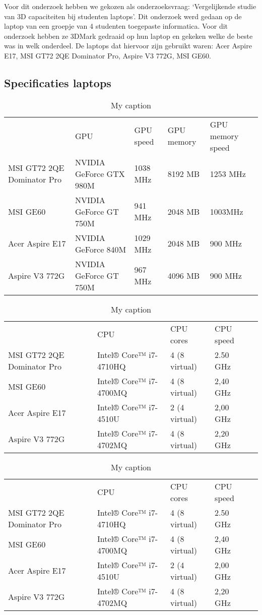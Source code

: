 Voor dit onderzoek hebben we gekozen als onderzoeksvraag: ‘Vergelijkende studie van 3D capaciteiten bij studenten laptops’. Dit onderzoek werd gedaan op de laptop van een groepje van 4 studenten toegepaste informatica. Voor dit onderzoek hebben ze 3DMark gedraaid op hun laptop en gekeken welke de beste was in welk onderdeel. De laptops dat hiervoor zijn gebruikt waren: Acer Aspire E17, MSI GT72 2QE Dominator Pro, Aspire V3 772G, MSI GE60. 
\subsection{Specificaties laptops}
\begin{table}[]
\centering
\caption{My caption}
\label{my-label}
\begin{tabular}{lllll}
                           & GPU                     & GPU speed & GPU memory & GPU memory speed \\
MSI GT72 2QE Dominator Pro & NVIDIA GeForce GTX 980M & 1038 MHz  & 8192 MB    & 1253 MHz         \\
MSI GE60                   & NVIDIA GeForce GT 750M  & 941 MHz   & 2048 MB    & 1003MHz          \\
Acer Aspire E17            & NVIDIA GeForce 840M     & 1029 MHz  & 2048 MB    & 900 MHz          \\
Aspire V3 772G             & NVIDIA GeForce GT 750M  & 967 MHz   & 4096 MB    & 900 MHz         
\end{tabular}
\end{table}
\begin{table}[]
\centering
\caption{My caption}
\label{my-label}
\begin{tabular}{lllll}
                           & CPU                    & CPU cores     & CPU speed   \\
MSI GT72 2QE Dominator Pro & Intel® Core™ i7-4710HQ & 4 (8 virtual) & 2.50 GHz    \\
MSI GE60                   & Intel® Core™ i7-4700MQ & 4 (8 virtual) & 2,40 GHz    \\
Acer Aspire E17            & Intel® Core™ i7-4510U  & 2 (4 virtual) & 2,00 GHz    \\
Aspire V3 772G             & Intel® Core™ i7-4702MQ & 4 (8 virtual) & 2,20 GHz  
\end{tabular}
\end{table}
\begin{table}[]
\centering
\caption{My caption}
\label{my-label}
\begin{tabular}{lllll}
                           & CPU                    & CPU cores     & CPU speed   \\
MSI GT72 2QE Dominator Pro & Intel® Core™ i7-4710HQ & 4 (8 virtual) & 2.50 GHz    \\
MSI GE60                   & Intel® Core™ i7-4700MQ & 4 (8 virtual) & 2,40 GHz    \\
Acer Aspire E17            & Intel® Core™ i7-4510U  & 2 (4 virtual) & 2,00 GHz    \\
Aspire V3 772G             & Intel® Core™ i7-4702MQ & 4 (8 virtual) & 2,20 GHz   
\end{tabular}
\end{table}